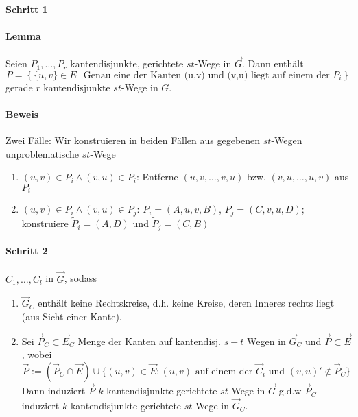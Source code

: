 \documentclass{article}
\newcommand{\set}[2]{\left\lbrace #1~|~#2 \right\rbrace}
\begin{document}
\paragraph{Schritt 1}
\paragraph{Lemma}
Seien $P_1, \ldots, P_r$ kantendisjunkte, gerichtete $st$-Wege in $\overrightarrow{G}$. Dann enthält
\[P = \set{\{u,v\} \in E}{\text{Genau eine der Kanten (u,v) und (v,u) liegt auf einem der }P_i}\]
gerade $r$ kantendisjunkte $st$-Wege in $G$.

\paragraph{Beweis}
Zwei Fälle: Wir konstruieren in beiden Fällen aus gegebenen $st$-Wegen unproblematische $st$-Wege
\begin{enumerate}
	\item $(u,v) \in P_i \wedge (v,u) \in P_i$: Entferne $(u, v, \ldots, v, u)$ bzw. $(v, u, \ldots, u, v)$ aus $P_i$
	\item $(u,v) \in P_i \wedge (v,u) \in P_j$: $P_i = (A, u, v, B)$, $P_j = (C, v, u, D)$; konstruiere $\widetilde{P}_i = (A, D)$ und $\widetilde{P}_j = (C, B)$
\end{enumerate}

\paragraph{Schritt 2}
$C_1,\ldots, C_l$ in $\overrightarrow{G}$, sodass
\begin{enumerate}
	\item $\overrightarrow{G}_C$ enthält keine Rechtskreise, d.h. keine Kreise, deren Inneres rechts liegt (aus Sicht einer Kante).
	\item Sei $\overrightarrow{P}_C \subset \overrightarrow{E}_C$ Menge der Kanten auf kantendisj. $s-t$ Wegen in $\overrightarrow{G}_C$ und $\overrightarrow{P} \subset \overrightarrow{E}$, wobei
	\[\overrightarrow{P} := (\overrightarrow{P}_C \cap \overrightarrow{E})\cup \{(u,v) \in \overrightarrow{E}: (u,v) \text{ auf einem der }\overrightarrow{C}_i \text{ und } (v,u)' \notin \overrightarrow{P}_C \} \]
	Dann induziert $\overrightarrow{P}$ $k$ kantendisjunkte gerichtete $st$-Wege in $\overrightarrow{G}$ g.d.w $\overrightarrow{P}_C$ induziert $k$ kantendisjunkte gerichtete $st$-Wege in $\overrightarrow{G}_C$.
\end{enumerate}
\end{document}
